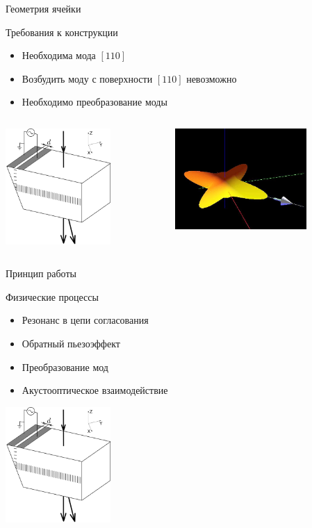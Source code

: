 \documentclass[ignorenonframetext,hyperref={pdftex,unicode}]{beamer}
\begin{document}
%
\begin{frame}{Геометрия ячейки}
  \begin{block}{Требования к конструкции}
    \begin{itemize}
    \item Необходима мода \([110]\)
    \item Возбудить моду с поверхности \([110]\) невозможно
    \item Необходимо преобразование моды
    \end{itemize}
  \end{block}
   \begin{columns}
     \begin{column}{5cm}
       \includegraphics[width=4cm]{pictures/cell_geometry.png}
     \end{column}
     \begin{column}{5cm}
       \includegraphics[width=5cm]{pictures/teo2_slowness.jpg}
     \end{column}
   \end{columns}
\end{frame}
%
\begin{frame}{Принцип работы}
  \begin{block}{Физические процессы}
    \begin{itemize}
      \item Резонанс в цепи согласования
      \item Обратный пьезоэффект
      \item Преобразование мод
      \item Акустооптическое взаимодействие
    \end{itemize}
  \end{block}
  \begin{center}
    \includegraphics[width=4cm]{pictures/cell_geometry.png}
  \end{center}
\end{frame}
\end{document}
